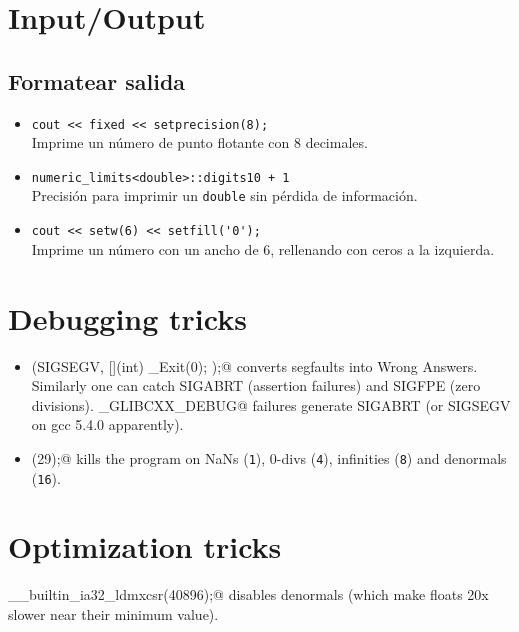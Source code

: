 \section{Input/Output}
	\subsection{Formatear salida}
	\begin{itemize}
		\item \verb|cout << fixed << setprecision(8);| \\
		Imprime un número de punto flotante con 8 decimales.
		\item \verb|numeric_limits<double>::digits10 + 1| \\
		Precisión para imprimir un \texttt{double} sin pérdida de información.
		\item \verb|cout << setw(6) << setfill('0');| \\
		Imprime un número con un ancho de 6, rellenando con ceros a la izquierda.
	\end{itemize}

\section{Debugging tricks}
    \begin{itemize}
        \item \verb@signal(SIGSEGV, [](int) { _Exit(0); });@ converts segfaults into Wrong Answers.
            Similarly one can catch SIGABRT (assertion failures) and SIGFPE (zero divisions).
            \verb@_GLIBCXX_DEBUG@ failures generate SIGABRT (or SIGSEGV on gcc 5.4.0 apparently).
        \item \verb@feenableexcept(29);@ kills the program on NaNs (\texttt 1), 0-divs (\texttt 4), infinities (\texttt 8) and denormals (\texttt{16}).
    \end{itemize}

\section{Optimization tricks}
    \verb@__builtin_ia32_ldmxcsr(40896);@ disables denormals (which make floats 20x slower near their minimum value).

